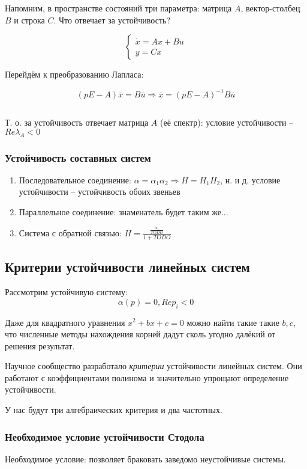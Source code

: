 \documentclass[main.tex]{subfiles}
\begin{document}
Напомним, в пространстве состояний три параметра: матрица $A$, вектор-столбец $B$ и строка $C$.
Что отвечает за устойчивость?

$$ \begin{cases}
\dot x = Ax + Bu \\
y = Cx
\end{cases} $$

Перейдём к преобразованию Лапласа:


$$ (pE-A) \bar x = B \bar u \Rightarrow \bar x = (pE-A)^{-1} B \bar u $$

$$  $$

Т. о. за устойчивость отвечает матрица $ A $ (её спектр): условие устойчивости -- $ Re \lambda_A < 0 $

\subsubsection{Устойчивость составных систем}

\begin{enumerate}[noitemsep]
	\item Последовательное соединение: $\alpha = \alpha_1 \alpha_2 \Rightarrow H = H_1 H_2$, н. и д. условие устойчивости -- устойчивость обоих звеньев 
	\item Параллельное соединение: знаменатель будет таким же...
	\item Система с обратной связью: $ H = \frac{\frac{\alpha_1}{TODO}}{1 + TODO} $ %
\end{enumerate}

\subsection{ Критерии устойчивости линейных систем }
Рассмотрим устойчивую систему:
$$ \alpha(p) = 0, Re p_i < 0 $$

Даже для квадратного уравнения $ x^2 + bx + c = 0 $ можно найти такие такие $b,c$, что численные методы нахождения корней дадут сколь угодно далёкий от решения результат.

Научное сообщество разработало \emph{критерии} устойчивости линейных систем.
Они работают с коэффициентами полинома и значительно упрощают определение устойчивости.

У нас будут три алгебраических критерия и два частотных.  

\subsubsection{Необходимое условие устойчивости Стодола}
Необходимое условие: позволяет браковать заведомо неустойчивые системы.
\end{document}
